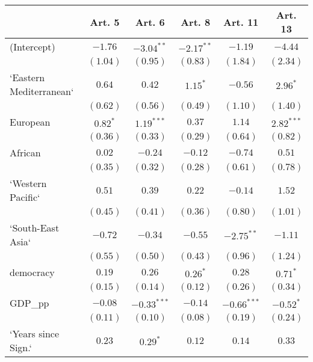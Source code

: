 
\begin{table}[!h]
\begin{center}
\begin{tabular}{l c c c c c }
\toprule
 & Art. 5 & Art. 6 & Art. 8 & Art. 11 & Art. 13 \\
\midrule
(Intercept)             & $-1.76$      & $-3.04^{**}$  & $-2.17^{**}$ & $-1.19$       & $-4.44$      \\
                        & $(1.04)$     & $(0.95)$      & $(0.83)$     & $(1.84)$      & $(2.34)$     \\
`Eastern Mediterranean` & $0.64$       & $0.42$        & $1.15^{*}$   & $-0.56$       & $2.96^{*}$   \\
                        & $(0.62)$     & $(0.56)$      & $(0.49)$     & $(1.10)$      & $(1.40)$     \\
European                & $0.82^{*}$   & $1.19^{***}$  & $0.37$       & $1.14$        & $2.82^{***}$ \\
                        & $(0.36)$     & $(0.33)$      & $(0.29)$     & $(0.64)$      & $(0.82)$     \\
African                 & $0.02$       & $-0.24$       & $-0.12$      & $-0.74$       & $0.51$       \\
                        & $(0.35)$     & $(0.32)$      & $(0.28)$     & $(0.61)$      & $(0.78)$     \\
`Western Pacific`       & $0.51$       & $0.39$        & $0.22$       & $-0.14$       & $1.52$       \\
                        & $(0.45)$     & $(0.41)$      & $(0.36)$     & $(0.80)$      & $(1.01)$     \\
`South-East Asia`       & $-0.72$      & $-0.34$       & $-0.55$      & $-2.75^{**}$  & $-1.11$      \\
                        & $(0.55)$     & $(0.50)$      & $(0.43)$     & $(0.96)$      & $(1.24)$     \\
democracy               & $0.19$       & $0.26$        & $0.26^{*}$   & $0.28$        & $0.71^{*}$   \\
                        & $(0.15)$     & $(0.14)$      & $(0.12)$     & $(0.26)$      & $(0.34)$     \\
GDP\_pp                 & $-0.08$      & $-0.33^{***}$ & $-0.14$      & $-0.66^{***}$ & $-0.52^{*}$  \\
                        & $(0.11)$     & $(0.10)$      & $(0.08)$     & $(0.19)$      & $(0.24)$     \\
`Years since Sign.`     & $0.23$       & $0.29^{*}$    & $0.12$       & $0.14$        & $0.33$       \\

\end{tabular}
\end{center}
\end{table}

